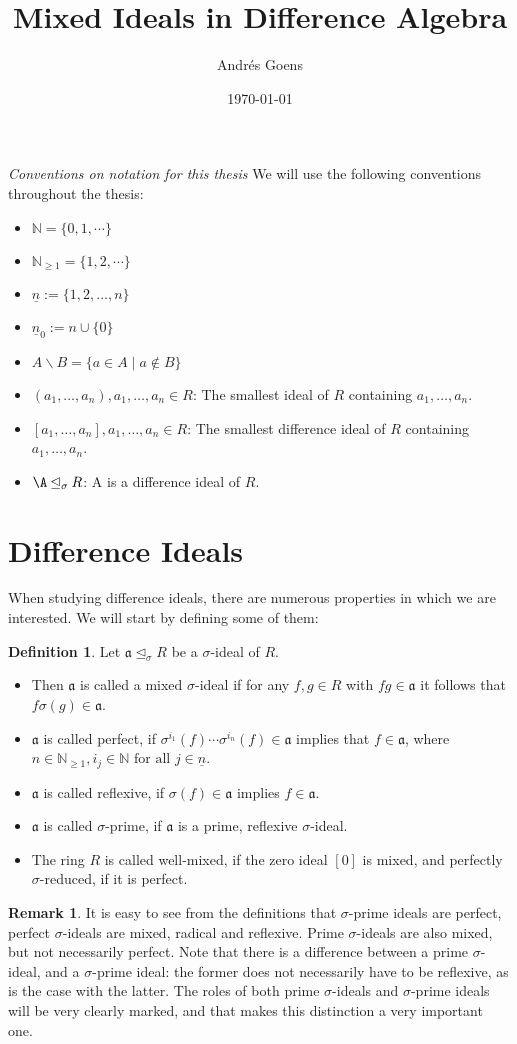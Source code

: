 \documentclass{article}
\title{Mixed Ideals in Difference Algebra}
\author{Andr\'{e}s Goens}
\date{\today}
\def\NE{\mathbb{N}_{\geq1}}
\def\N{\mathbb{N}}
\def\a{\mathfrak{a}}
\def\s{\sigma}
\def\si{\unlhd_{\sigma}}
\def\n{\underline{n}}
\def\fa{\text{ for all }}
\theoremstyle{definition}
\newtheorem{rem}[Satz]{Remark}
\newtheorem{defn}[Satz]{Definition}
\begin{document}
\emph{Conventions on notation for this thesis}
We will use the following conventions throughout the thesis:
\begin{itemize}
\item $\N = \{0,1,\cdots \}$
\item $\NE = \{1,2,\cdots \}$
\item $ \n := \{1,2,\ldots, n\}$
\item $ \n_0 := n \cup \{0\}$
\item $A \backslash B = \{ a \in A \mid a \notin B \}$
\item $(a_1,\ldots,a_n), a_1,\ldots,a_n \in R$: The smallest ideal of $R$ containing $a_1,\ldots,a_n$.
\item $[a_1,\ldots,a_n], a_1,\ldots,a_n \in R$: The smallest difference ideal of $R$ containing $a_1,\ldots,a_n$.
\item $\A \si R$: A is a difference ideal of $R$.
\end{itemize}
\clearpage
\section{Difference Ideals}
When studying difference ideals, there are numerous properties in which we are interested. We will start by defining some of them:
\begin{defn}
Let  $\a \si R$ be a $\s$-ideal of $R$. 
\begin{itemize}
\item Then $\a$ is called a mixed $\s$-ideal if for any $f,g \in R$ with $fg \in \a$ it follows that $f \sigma(g) \in \a$. 
\item $\a$ is called perfect, if $\sigma^{i_1}(f) \cdots \sigma^{i_n}(f) \in \a$ implies that $f \in \a$, where $n \in \NE, i_j \in \N \fa j \in \n$. 
\item $\a$ is called reflexive, if $\s(f) \in \a$ implies $f \in \a$. 
\item $\a$ is called $\s$-prime, if $\a$ is a prime, reflexive $\s$-ideal.
\item The ring $R$ is called well-mixed, if the zero ideal $[0]$ is mixed, and perfectly $\s$-reduced, if it is perfect.
\end{itemize}
\end{defn}

\begin{rem}
It is easy to see from the definitions that $\s$-prime ideals are perfect, perfect $\s$-ideals are mixed, radical and reflexive. Prime $\s$-ideals are also mixed, but not necessarily perfect. Note that there is a difference between a prime $\s$-ideal, and a $\s$-prime ideal:
the former does not necessarily have to be reflexive, as is the case with the latter. The roles of both prime $\s$-ideals and $\s$-prime ideals will be very clearly marked, and that makes this distinction a very important one.
\end{rem}
\end{document}
